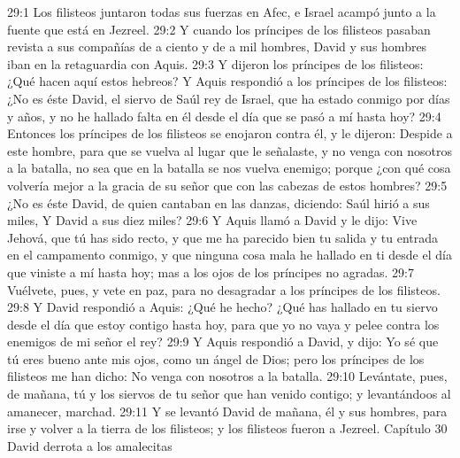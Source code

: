 29:1 Los filisteos juntaron todas sus fuerzas en Afec, e Israel acampó junto a la fuente que está en Jezreel.  
29:2 Y cuando los príncipes de los filisteos pasaban revista a sus compañías de a ciento y de a mil hombres, David y sus hombres iban en la retaguardia con Aquis.  
29:3 Y dijeron los príncipes de los filisteos: ¿Qué hacen aquí estos hebreos? Y Aquis respondió a los príncipes de los filisteos: ¿No es éste David, el siervo de Saúl rey de Israel, que ha estado conmigo por días y años, y no he hallado falta en él desde el día que se pasó a mí hasta hoy?  
29:4 Entonces los príncipes de los filisteos se enojaron contra él, y le dijeron: Despide a este hombre, para que se vuelva al lugar que le señalaste, y no venga con nosotros a la batalla, no sea que en la batalla se nos vuelva enemigo; porque ¿con qué cosa volvería mejor a la gracia de su señor que con las cabezas de estos hombres?  
29:5 ¿No es éste David, de quien cantaban en las danzas, diciendo:  
Saúl hirió a sus miles,  
Y David a sus diez miles?  
29:6 Y Aquis llamó a David y le dijo: Vive Jehová, que tú has sido recto, y que me ha parecido bien tu salida y tu entrada en el campamento conmigo, y que ninguna cosa mala he hallado en ti desde el día que viniste a mí hasta hoy; mas a los ojos de los príncipes no agradas.  
29:7 Vuélvete, pues, y vete en paz, para no desagradar a los príncipes de los filisteos.  
29:8 Y David respondió a Aquis: ¿Qué he hecho? ¿Qué has hallado en tu siervo desde el día que estoy contigo hasta hoy, para que yo no vaya y pelee contra los enemigos de mi señor el rey?  
29:9 Y Aquis respondió a David, y dijo: Yo sé que tú eres bueno ante mis ojos, como un ángel de Dios; pero los príncipes de los filisteos me han dicho: No venga con nosotros a la batalla.  
29:10 Levántate, pues, de mañana, tú y los siervos de tu señor que han venido contigo; y levantándoos al amanecer, marchad.  
29:11 Y se levantó David de mañana, él y sus hombres, para irse y volver a la tierra de los filisteos; y los filisteos fueron a Jezreel.  
Capítulo 30
David derrota a los amalecitas  

